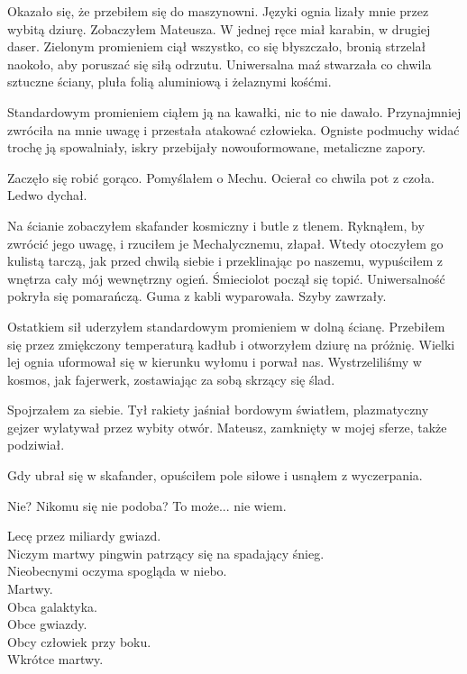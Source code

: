 Okazało się, że przebiłem się do maszynowni.
Języki ognia lizały mnie przez wybitą dziurę.
Zobaczyłem Mateusza. 
W jednej ręce miał karabin, w drugiej daser.
Zielonym promieniem ciął wszystko, co się błyszczało, bronią strzelał naokoło, aby poruszać się siłą odrzutu.
Uniwersalna maź stwarzała co chwila sztuczne ściany, pluła folią aluminiową i żelaznymi kośćmi. 

Standardowym promieniem ciąłem ją na kawałki, nic to nie dawało.
Przynajmniej zwróciła na mnie uwagę i przestała atakować człowieka.
Ogniste podmuchy widać trochę ją spowalniały, iskry przebijały nowouformowane, metaliczne zapory.

Zaczęło się robić gorąco. Pomyślałem o Mechu. 
Ocierał co chwila pot z czoła.
Ledwo dychał.

Na ścianie zobaczyłem skafander kosmiczny i butle z tlenem.
Ryknąłem, by zwrócić jego uwagę, i rzuciłem je Mechalycznemu, złapał.
Wtedy otoczyłem go kulistą tarczą, jak przed chwilą siebie i przeklinając po naszemu, wypuściłem z wnętrza cały mój wewnętrzny ogień.
Śmieciolot począł się topić.
Uniwersalność pokryła się pomarańczą. 
Guma z kabli wyparowała. 
Szyby zawrzały.

Ostatkiem sił uderzyłem standardowym promieniem w dolną ścianę.
Przebiłem się przez zmiękczony temperaturą kadłub i otworzyłem dziurę na próżnię.
Wielki lej ognia uformował się w kierunku wyłomu i porwał nas.
Wystrzeliliśmy w kosmos, jak fajerwerk, zostawiając za sobą skrzący się ślad.

Spojrzałem za siebie. Tył rakiety jaśniał bordowym światłem, plazmatyczny gejzer wylatywał przez wybity otwór.
Mateusz, zamknięty w mojej sferze, także podziwiał.

Gdy ubrał się w skafander, opuściłem pole siłowe i usnąłem z wyczerpania.

\divider{}

Nie?
Nikomu się nie podoba?
To może... nie wiem.

\divider{}

\noindent
Lecę przez miliardy gwiazd. \\
Niczym martwy pingwin patrzący się na spadający śnieg. \\
Nieobecnymi oczyma spogląda w niebo. \\
Martwy. \\

\noindent
Obca galaktyka. \\
Obce gwiazdy. \\
Obcy człowiek przy boku. \\
Wkrótce martwy. \\

